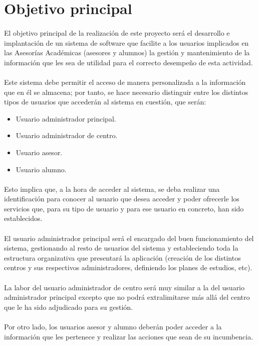 \section{Objetivo principal}

\paragraph{}El objetivo principal de la realización de este proyecto será el
desarrollo e implantación de un sistema de software que facilite a los usuarios
implicados en las Asesorías Académicas (asesores y alumnos) la gestión y
mantenimiento de la información que les sea de utilidad para el correcto
desempeño de esta actividad.

\paragraph{}Este sistema debe permitir el acceso de manera personalizada a la
información que en él se almacena; por tanto, se hace necesario distinguir entre
los distintos tipos de usuarios que accederán al sistema en cuestión, que serán:

\begin{itemize}
 \item Usuario administrador principal.
 \item Usuario administrador de centro.
 \item Usuario asesor.
 \item Usuario alumno.
\end{itemize}

\paragraph{}Esto implica que, a la hora de acceder al sistema, se deba realizar
una identificación para conocer al usuario que desea acceder y poder ofrecerle
los servicios que, para su tipo de usuario y para ese usuario en concreto, han
sido establecidos.

\paragraph{}El usuario administrador principal será el encargado del buen
funcionamiento del sistema, gestionando al resto de usuarios del sistema y
estableciendo toda la estructura organizativa que presentará la aplicación
(creación de los distintos centros y sus respectivos administradores, definiendo
los planes de estudios, etc).

\paragraph{}La labor del usuario administrador de centro será muy similar a la
del usuario administrador principal excepto que no podrá extralimitarse más
allá del centro que le ha sido adjudicado para su gestión.

\paragraph{}Por otro lado, los usuarios asesor y alumno deberán poder acceder a
la información que les pertenece y realizar las acciones que sean de su
incumbencia.